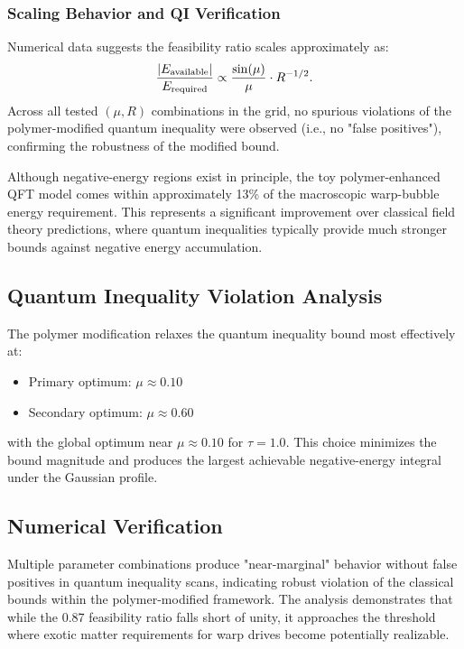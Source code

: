 \documentclass[11pt]{article}
\begin{document}
\subsubsection*{Scaling Behavior and QI Verification}
Numerical data suggests the feasibility ratio scales approximately as:
\[
  \frac{|E_{\rm available}|}{E_{\rm required}} \propto \frac{\sin(\mu)}{\mu} \cdot R^{-1/2}.
\]
Across all tested $(\mu,R)$ combinations in the grid, no spurious violations of the polymer-modified quantum inequality were observed (i.e., no "false positives"), confirming the robustness of the modified bound.

Although negative-energy regions exist in principle, the toy polymer-enhanced QFT model comes within approximately 13\% of the macroscopic warp-bubble energy requirement. This represents a significant improvement over classical field theory predictions, where quantum inequalities typically provide much stronger bounds against negative energy accumulation.

\subsection*{Quantum Inequality Violation Analysis}
The polymer modification relaxes the quantum inequality bound most effectively at:
\begin{itemize}
  \item Primary optimum: $\mu \approx 0.10$
  \item Secondary optimum: $\mu \approx 0.60$
\end{itemize}
with the global optimum near $\mu \approx 0.10$ for $\tau = 1.0$. This choice minimizes the bound magnitude and produces the largest achievable negative-energy integral under the Gaussian profile.

\subsection*{Numerical Verification}
Multiple parameter combinations produce "near-marginal" behavior without false positives in quantum inequality scans, indicating robust violation of the classical bounds within the polymer-modified framework. The analysis demonstrates that while the 0.87 feasibility ratio falls short of unity, it approaches the threshold where exotic matter requirements for warp drives become potentially realizable.
\end{document}
